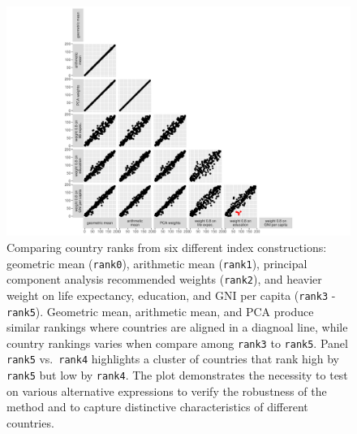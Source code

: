 \documentclass[
]{article}
\begin{document}
\begin{figure}

{\centering \includegraphics{paper_files/figure-pdf/fig-hdi-expr-1.pdf}

}

\caption{\label{fig-hdi-expr}Comparing country ranks from six different
index constructions: geometric mean (\texttt{rank0}), arithmetic mean
(\texttt{rank1}), principal component analysis recommended weights
(\texttt{rank2}), and heavier weight on life expectancy, education, and
GNI per capita (\texttt{rank3} - \texttt{rank5}). Geometric mean,
arithmetic mean, and PCA produce similar rankings where countries are
aligned in a diagnoal line, while country rankings varies when compare
among \texttt{rank3} to \texttt{rank5}. Panel \texttt{rank5}
vs.~\texttt{rank4} highlights a cluster of countries that rank high by
\texttt{rank5} but low by \texttt{rank4}. The plot demonstrates the
necessity to test on various alternative expressions to verify the
robustness of the method and to capture distinctive characteristics of
different countries.}

\end{figure}
\end{document}
